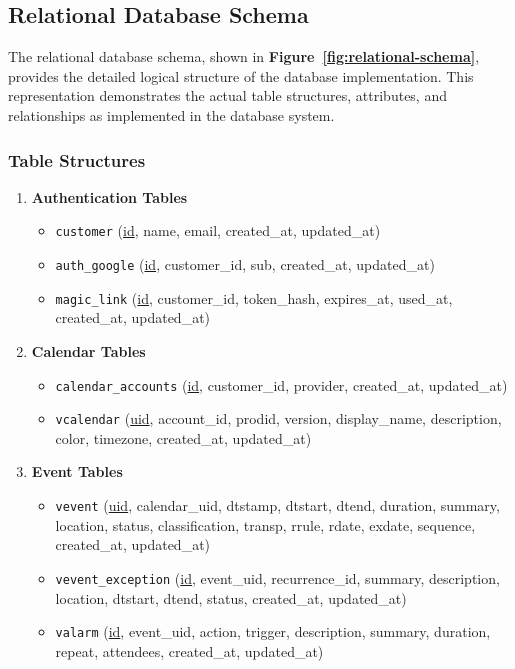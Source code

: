 \documentclass[12pt,a4paper,twoside]{report}
\begin{document}
\subsection{Relational Database Schema}

The relational database schema, shown in \textbf{Figure~\ref{fig:relational-schema}}, provides the detailed logical structure of the database implementation. This representation demonstrates the actual table structures, attributes, and relationships as implemented in the database system.

\subsubsection{Table Structures}

\begin{enumerate}
    \item \textbf{Authentication Tables}
          \begin{itemize}
              \item \texttt{customer} (\underline{id}, name, email, created\_at, updated\_at)
              \item \texttt{auth\_google} (\underline{id}, customer\_id, sub, created\_at, updated\_at)
              \item \texttt{magic\_link} (\underline{id}, customer\_id, token\_hash, expires\_at, used\_at, created\_at, updated\_at)
          \end{itemize}

    \item \textbf{Calendar Tables}
          \begin{itemize}
              \item \texttt{calendar\_accounts} (\underline{id}, customer\_id, provider, created\_at, updated\_at)
              \item \texttt{vcalendar} (\underline{uid}, account\_id, prodid, version, display\_name, description, color, timezone, created\_at, updated\_at)
          \end{itemize}

    \item \textbf{Event Tables}
          \begin{itemize}
              \item \texttt{vevent} (\underline{uid}, calendar\_uid, dtstamp, dtstart, dtend, duration, summary, location, status, classification, transp, rrule, rdate, exdate, sequence, created\_at, updated\_at)
              \item \texttt{vevent\_exception} (\underline{id}, event\_uid, recurrence\_id, summary, description, location, dtstart, dtend, status, created\_at, updated\_at)
              \item \texttt{valarm} (\underline{id}, event\_uid, action, trigger, description, summary, duration, repeat, attendees, created\_at, updated\_at)
          \end{itemize}
\end{enumerate}
\end{document}
